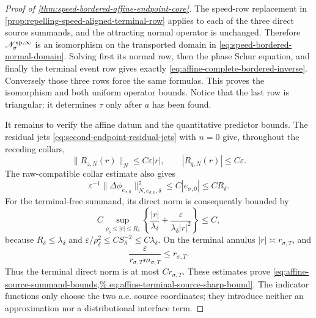 \begin{proof}[Proof of
\cref{thm:speed-bordered-affine-endpoint-core}]
The speed-row replacement in
\cref{prop:repelling-speed-aligned-terminal-row} applies to each of the
three direct source summands, and the attracting normal operator is
unchanged.  Therefore
\(\mathscr N_\sigma^{\rm sp,\infty}\) is an isomorphism on the transported
domain in \cref{eq:speed-bordered-normal-domain}.  Solving first its
normal row, then the phase Schur equation, and finally the terminal event
row gives exactly
\cref{eq:affine-complete-bordered-inverse}.  Conversely those three rows
force the same formulas.  This proves the isomorphism and both uniform
operator bounds.  Notice that the last row is triangular: it determines
\(\tau\) only after \(a\) has been found.

It remains to verify the affine datum and the quantitative predictor
bounds.  The residual jets
\cref{eq:second-endpoint-residual-jets} with \(n=0\) give, throughout the
receding collars,
\begin{equation}
 \|R_{z,N}(r)\|_N\le C\varepsilon|r|,
 \qquad |R_{q,N}(r)|\le C\varepsilon.           \label{eq:proof-affine-residual-pointwise}
\end{equation}
The raw-compatible collar estimate also gives
\[
 \varepsilon^{-1}
 \|\Delta\phi_{e_{\sigma,0}}\|_{N,e_{\sigma,0},\delta}^{\sharp}
 \le C|e_{\sigma,0}|\le CR_\delta.
\]
For the terminal-free summand, its direct norm is consequently bounded by
\begin{equation}
 C\sup_{\rho_\delta\le |r|\le R_\delta}
 \left\{\frac{|r|}{\lambda_\delta}
       +\frac{\varepsilon}
              {\lambda_\delta|r|^2}\right\}
 \le C,                                         \label{eq:proof-affine-bulk-source}
\end{equation}
because \(R_\delta\le\lambda_\delta\) and
\(\varepsilon/\rho_\delta^2\le C S_\delta^{-2}
\le C\lambda_\delta\).
On the terminal annulus \(|r|\asymp r_{\sigma,T}\), and
\[
 \frac{\varepsilon}{r_{\sigma,T}m_{\sigma,T}}
 \le r_{\sigma,T}.
\]
Thus the terminal direct norm is at most \(Cr_{\sigma,T}\).
These estimates prove
\cref{eq:affine-source-summand-bounds,%
eq:affine-terminal-source-sharp-bound}.  The indicator functions only
choose the two a.e. source coordinates; they introduce neither an
approximation nor a distributional interface term.


\end{proof}
